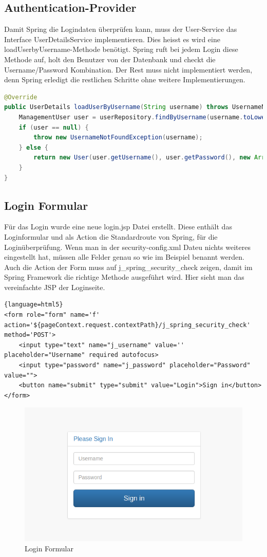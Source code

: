 \subsection{Authentication-Provider}
Damit Spring die Logindaten überprüfen kann, muss der User-Service das Interface UserDetailsService implementieren. Dies heisst es wird eine loadUserbyUsername-Methode benötigt. Spring ruft bei jedem Login diese Methode auf, holt den Benutzer von der Datenbank und checkt die Username/Password Kombination. Der Rest muss nicht implementiert werden, denn Spring erledigt die restlichen Schritte ohne weitere Implementierungen.
\begin{lstlisting}[language=java]
@Override
public UserDetails loadUserByUsername(String username) throws UsernameNotFoundException {
	ManagementUser user = userRepository.findByUsername(username.toLowerCase());
	if (user == null) {
		throw new UsernameNotFoundException(username);
	} else {
		return new User(user.getUsername(), user.getPassword(), new ArrayList<>());
	}
}
\end{lstlisting}

	
\subsection{Login Formular}
Für das Login wurde eine neue login.jsp Datei erstellt. Diese enthält das Loginformular und als Action die Standardroute von Spring, für die Loginüberprüfung. Wenn man in der security-config.xml Dateu nichts weiteres eingestellt hat, müssen alle Felder genau so wie im Beispiel benannt werden. Auch die Action der Form muss auf j\_spring\_security\_check zeigen, damit im Spring Framework die richtige Methode ausgeführt wird. Hier sieht man das vereinfachte JSP der Loginseite.
\begin{lstlisting}{language=html5}
<form role="form" name='f' action='${pageContext.request.contextPath}/j_spring_security_check' method='POST'>
	<input type="text" name="j_username" value='' placeholder="Username" required autofocus>
	<input type="password" name="j_password" placeholder="Password" value="">
	<button name="submit" type="submit" value="Login">Sign in</button>
</form>
\end{lstlisting}

\begin{figure}[H]
\centering
\includegraphics[scale=0.5]{../04_Realisierung/images/loginform.png}
\caption{Login Formular}
\end{figure}

